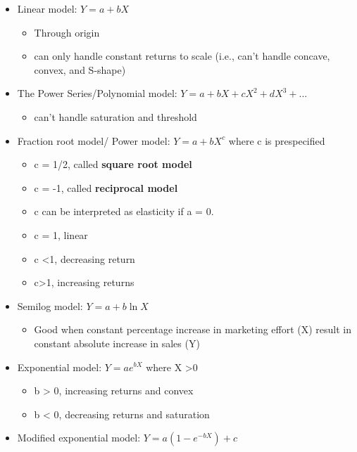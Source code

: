 \documentclass[
]{book}
\providecommand{\tightlist}{%
  \setlength{\itemsep}{0pt}\setlength{\parskip}{0pt}}
\begin{document}
\begin{itemize}
\item
  Linear model: \(Y = a + bX\)

  \begin{itemize}
  \item
    Through origin
  \item
    can only handle constant returns to scale (i.e., can't handle concave, convex, and S-shape)
  \end{itemize}
\item
  The Power Series/Polynomial model: \(Y = a + bX + c X^2 + dX^3 + ...\)

  \begin{itemize}
  \tightlist
  \item
    can't handle saturation and threshold
  \end{itemize}
\item
  Fraction root model/ Power model: \(Y = a+bX^c\) where c is prespecified

  \begin{itemize}
  \item
    c = 1/2, called \textbf{square root model}
  \item
    c = -1, called \textbf{reciprocal model}
  \item
    c can be interpreted as elasticity if a = 0.
  \item
    c = 1, linear
  \item
    c \textless1, decreasing return
  \item
    c\textgreater1, increasing returns
  \end{itemize}
\item
  Semilog model: \(Y = a + b \ln X\)

  \begin{itemize}
  \tightlist
  \item
    Good when constant percentage increase in marketing effort (X) result in constant absolute increase in sales (Y)
  \end{itemize}
\item
  Exponential model: \(Y = ae^{bX}\) where X \textgreater0

  \begin{itemize}
  \item
    b \textgreater{} 0, increasing returns and convex
  \item
    b \textless{} 0, decreasing returns and saturation
  \end{itemize}
\item
  Modified exponential model: \(Y = a(1-e^{-bX}) +c\)


\end{itemize}
\end{document}
